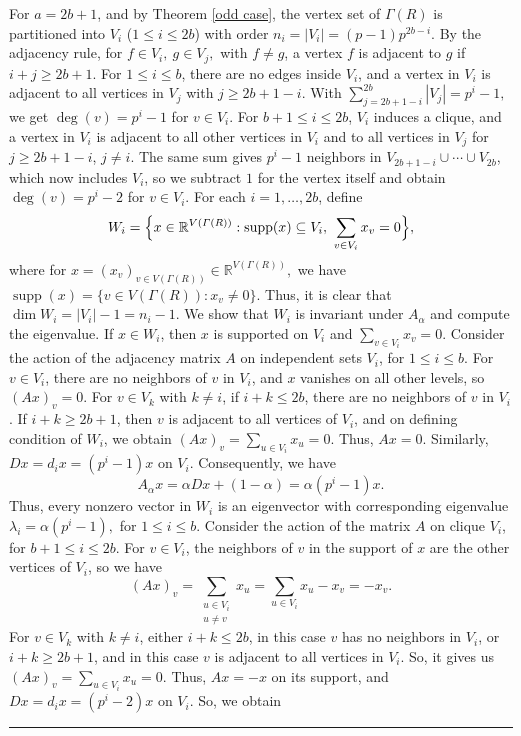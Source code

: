 \documentclass[12pt,twoside]{article}
\renewenvironment{proof}{{\noindent\bfseries Proof.}}{\qed}
\def\qed{\nolinebreak\hfill\rule{.2cm}{.2cm}\par\addvspace{.5cm}}
\begin{document}
\begin{proof}
	For  $a=2b+1$, and by Theorem \ref{odd case}, the vertex set of $ \varGamma(R)$ is partitioned into $V_i$ ($1\le i\le 2b$)  with order $n_i = |V_i| = (p-1)p^{ 2b-i}.$
	By the adjacency rule, for	$f\in V_i,\ g\in V_j, $ with $f\ne g$, a vertex  $f$ is adjacent to $g$  if $i+j\ge 2b+1.$  For $1\le i\le b$, there are no edges inside $V_i$, and a vertex in $V_i$ is adjacent to all vertices in $V_j$ with $j\ge 2b+1-i$. With $\sum_{j=2b+1-i}^{2b} |V_j| = p^{ i}-1,$	we get $\deg(v)=p^{ i}-1$ for $v\in V_i$. For $b+1\le i\le 2b$, $V_i$ induces a clique, and a vertex in $V_i$ is adjacent to all other vertices in $V_i$ and to all vertices in $V_j$ for $j\ge 2b+1-i$, $j\ne i$. The same sum gives $p^{ i}-1$ neighbors in $V_{2b+1-i}\cup\cdots\cup V_{2b}$, which now includes $V_i$, so we subtract $1$ for the vertex itself and obtain $\deg(v) = p^{ i}-2$ for $v\in V_i$. 	For each $i=1,\dots,2b$, define
	\[
	W_i = \Bigl\{x\in\mathbb{R}^{V( \varGamma(R))} :
	\mathrm{supp}(x)\subseteq V_i,\ \sum_{v\in V_i} x_v = 0\Bigr\},
	\]
	where  for $x = (x_v)_{v \in V( \varGamma(R))} \in \mathbb{R}^{V( \varGamma(R))},$ we have $\operatorname{supp}(x)= \{  v \in V( \varGamma(R)) : x_v \neq 0  \}.$ 	Thus, it is clear that $\dim W_i = |V_i|-1 = n_i -1$. We show that $W_i$ is invariant under $A_\alpha$ and compute the eigenvalue. If $x\in W_i$, then $x$ is supported on $V_i$ and $\sum_{v\in V_i}x_v=0$. Consider the action of the adjacency matrix $A$ on independent sets  $V_i$, for $1\leq i\leq b.$ 	For $v\in V_i$, there are no neighbors of $v$ in $V_i$, and $x$ vanishes on all other levels,
	so $(Ax)_v=0$.
	For $v\in V_k$ with $k\ne i$, if $i+k\le 2b$, there are no neighbors of $v$ in $V_i$. If $i+k\ge 2b+1$, then $v$ is adjacent to all vertices of $V_i$, and on defining condition of $W_i$, we obtain $(Ax)_v = \sum_{u\in V_i} x_u = 0.$ Thus, $Ax=0$. Similarly, $Dx=d_i x = (p^{ i}-1)x$ on $V_i$. Consequently, we have 
	$$ A_\alpha x = \alpha Dx + (1-\alpha) = \alpha(p^{ i}-1)x. $$
	Thus, every nonzero vector in $W_i$ is an eigenvector with corresponding eigenvalue $\lambda_i = \alpha(p^{ i}-1),$ for $1\le i\le b.$	Consider the action of the matrix $A$  on clique $V_i$, for $b+1\leq i\leq 2b. $ For $v\in V_i$, the neighbors of $v$ in the support of $x$ are the other vertices of $V_i$,	so we have 
	\[
	(Ax)_v = \sum_{\substack{u\in V_i\\ u\ne v}} x_u = \sum_{u\in V_i} x_u - x_v = -x_v.
	\]
	For $v\in V_k$ with $k\ne i$, either $i+k\le 2b$, in this case $v$ has no neighbors in $V_i$,
	or $i+k\ge 2b+1$, and in this case $v$ is adjacent to all vertices in $V_i$. So, it gives us $(Ax)_v = \sum_{u\in V_i} x_u = 0.$	Thus, $Ax=-x$ on its support, and $Dx=d_i x =(p^{ i}-2)x$ on $V_i$. So, we obtain

\end{proof}
\end{document}
